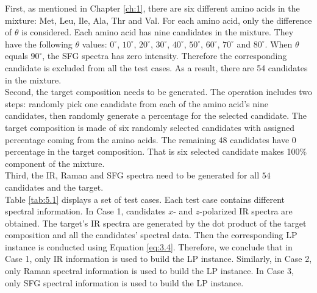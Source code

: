 First, as mentioned in Chapter \ref{ch:1}, there are six different amino acids in the mixture: Met, Leu, Ile, Ala, Thr and Val. For each amino acid, only the difference of $\theta$ is considered. Each amino acid has nine candidates in the mixture. They have the following $\theta$ values: $0^{\circ}$,  $10^{\circ}$, $20^{\circ}$, $30^{\circ}$, $40^{\circ}$, $50^{\circ}$, $60^{\circ}$, $70^{\circ}$ and $80^{\circ}$. When $\theta$ equals $90^{\circ}$, the SFG spectra has zero intensity. Therefore the corresponding candidate is excluded from all the test cases. As a result, there are 54 candidates in the mixture. \\

Second, the target composition needs to be generated. The operation includes two steps: randomly pick one candidate from each of the amino acid's nine candidates, then randomly generate a percentage for the selected candidate. The target composition is made of six randomly selected candidates with assigned percentage coming from the amino acids. The remaining $48$ candidates have $0$ percentage in the target composition. That is six selected candidate makes 100\% component of the mixture. \\

Third, the IR, Raman and SFG spectra need to be generated for all $54$ candidates and the target. \\

Table \ref{tab:5.1} displays a set of test cases. Each test case contains different spectral information. In Case 1, candidates $x$- and $z$-polarized IR spectra are obtained. The target's IR spectra are generated by the dot product of the target composition and all the candidates' spectral data. Then the corresponding LP instance is conducted using Equation \ref{eq:3.4}. Therefore, we conclude that in Case 1, only IR information is used to build the LP instance. Similarly, in Case 2, only Raman spectral information is used to build the LP instance. In Case 3, only SFG spectral information is used to build the LP instance. \\


